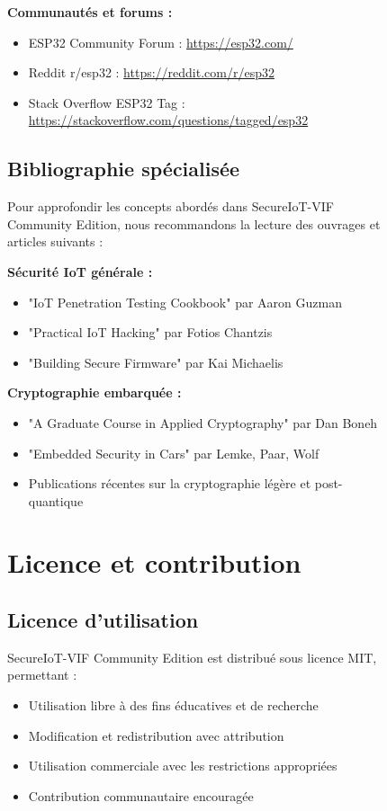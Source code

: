 \begin{figure}[h]
\begin{table}[h]
\textbf{Communautés et forums :}
\begin{itemize}
    \item ESP32 Community Forum : \url{https://esp32.com/}
    \item Reddit r/esp32 : \url{https://reddit.com/r/esp32}
    \item Stack Overflow ESP32 Tag : \url{https://stackoverflow.com/questions/tagged/esp32}
\end{itemize}

\subsection{Bibliographie spécialisée}

Pour approfondir les concepts abordés dans SecureIoT-VIF Community Edition, nous recommandons la lecture des ouvrages et articles suivants :

\textbf{Sécurité IoT générale :}
\begin{itemize}
    \item "IoT Penetration Testing Cookbook" par Aaron Guzman
    \item "Practical IoT Hacking" par Fotios Chantzis
    \item "Building Secure Firmware" par Kai Michaelis
\end{itemize}

\textbf{Cryptographie embarquée :}
\begin{itemize}
    \item "A Graduate Course in Applied Cryptography" par Dan Boneh
    \item "Embedded Security in Cars" par Lemke, Paar, Wolf
    \item Publications récentes sur la cryptographie légère et post-quantique
\end{itemize}

\section{Licence et contribution}
\label{app:license}

\subsection{Licence d'utilisation}

SecureIoT-VIF Community Edition est distribué sous licence MIT, permettant :
\begin{itemize}
    \item Utilisation libre à des fins éducatives et de recherche
    \item Modification et redistribution avec attribution
    \item Utilisation commerciale avec les restrictions appropriées
    \item Contribution communautaire encouragée
\end{itemize}


\end{table}
\end{figure}
